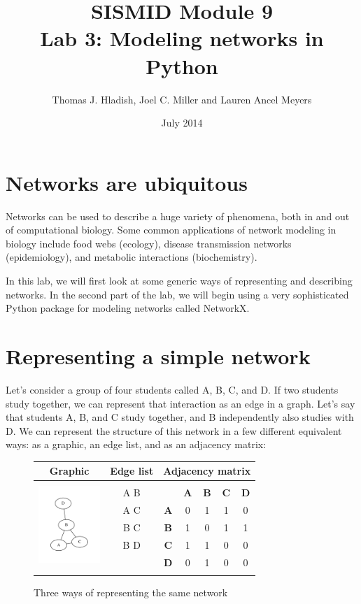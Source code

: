 \documentclass{article}
\begin{document}
\title{SISMID Module 9\\Lab 3: Modeling networks in Python}
\author{Thomas J. Hladish, Joel C. Miller and Lauren Ancel Meyers}
\date{July 2014}
\maketitle


\section*{Networks are ubiquitous}
Networks can be used to describe a huge variety of phenomena, both in and out of computational biology.  
Some common applications of network modeling in biology include food webs (ecology), disease transmission networks (epidemiology), 
and metabolic interactions (biochemistry).

In this lab, we will first look at some generic ways of representing and describing networks.  In the second part of the lab, we will
 begin using a very sophisticated Python package for modeling networks called NetworkX.

\section*{Representing a simple network}
Let's consider a group of four students called A, B, C, and D.  If two students study together, we can represent that interaction as an
 edge in a graph.  Let's say that students A, B, and C study together, and B independently also studies with D.  We can represent the 
structure of this network in a few different equivalent ways: as a graphic, an edge list, and as an adjacency matrix:

\UndefineShortVerb{\|}
\begin{figure}[h]
\begin{center}
\begin{tabular}{|c|c|c c c c c|}
\hline
\textbf{Graphic}	&\textbf{Edge list}	&\multicolumn{5}{|c|}{\textbf{Adjacency matrix}}	\\ \hline

\multirow{6}{*}{\includegraphics[trim = .4in .4in .4in .4in, clip, height=1.15in]{7_sampleABC.pdf}} &&&&&& \\
& A B & & \textbf{A} & \textbf{B} & \textbf{C} & \textbf{D} \\
& A C & \textbf{A} & 0 & 1 & 1 & 0\\
& B C & \textbf{B} & 1 & 0 & 1 & 1\\
& B D & \textbf{C} & 1 & 1 & 0 & 0\\
& & \textbf{D} & 0 & 1 & 0 & 0\\
&&&&&&\\
\hline
\end{tabular}
\caption{Three ways of representing the same network}
\end{center}
\end{figure}
\end{document}
